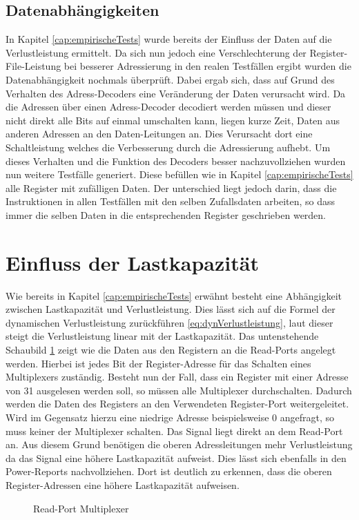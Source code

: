 \subsection{Datenabhängigkeiten}
In Kapitel \ref{cap:empirischeTests} wurde bereits der Einfluss der Daten auf die Verlustleistung ermittelt. Da sich nun jedoch eine Verschlechterung der Register-File-Leistung bei besserer Adressierung in den realen Testfällen ergibt wurden die Datenabhängigkeit nochmals überprüft. Dabei ergab sich, dass auf Grund des Verhalten des Adress-Decoders eine Veränderung der Daten verursacht wird. Da die Adressen über einen Adress-Decoder decodiert werden müssen und dieser nicht direkt alle Bits auf einmal umschalten kann, liegen kurze Zeit, Daten aus anderen Adressen an den Daten-Leitungen an. Dies Verursacht dort eine Schaltleistung welches die Verbesserung durch die Adressierung aufhebt.
Um dieses Verhalten und die Funktion des Decoders besser nachzuvollziehen wurden nun weitere Testfälle generiert. Diese befüllen wie in Kapitel \ref{cap:empirischeTests} alle Register mit zufälligen Daten. Der unterschied liegt jedoch darin, dass die Instruktionen in allen Testfällen mit den selben Zufallsdaten arbeiten, so dass immer die selben Daten in die entsprechenden Register geschrieben werden.

\section{Einfluss der Lastkapazität}
 \label{cap:lastkapa}
Wie bereits in Kapitel \ref{cap:empirischeTests} erwähnt besteht eine Abhängigkeit zwischen Lastkapazität und Verlustleistung. Dies lässt sich auf die Formel der dynamischen Verlustleistung zurückführen \ref{eq:dynVerlustleistung}, laut dieser steigt die Verlustleistung linear mit der Lastkapazität.
Das untenstehende Schaubild \ref{fig:read_port_mux} zeigt wie die Daten aus den Registern an die Read-Ports angelegt werden. Hierbei ist jedes Bit der Register-Adresse für das Schalten eines Multiplexers zuständig. Besteht nun der Fall, dass ein Register mit einer Adresse von 31 ausgelesen werden soll, so müssen alle Multiplexer durchschalten. Dadurch werden die Daten des Registers an den Verwendeten Register-Port weitergeleitet. Wird im Gegensatz hierzu eine niedrige Adresse beispielsweise 0 angefragt, so muss keiner der Multiplexer schalten. Das Signal liegt direkt an dem Read-Port an. Aus diesem Grund benötigen die oberen Adressleitungen mehr Verlustleistung da das Signal eine höhere Lastkapazität aufweist. Dies lässt sich ebenfalls in den Power-Reports nachvollziehen. Dort ist deutlich zu erkennen, dass die oberen Register-Adressen eine höhere Lastkapazität aufweisen. 
\begin{scriptsize}
	\begin{figure}[htbp] 
		\centering
		
		\caption{Read-Port Multiplexer}
		\label{fig:read_port_mux}
	\end{figure}
\end{scriptsize}

